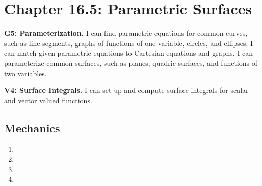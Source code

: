 \fancyhead[R]{\daytwentyfive}

\section*{\centering Chapter 16.5: Parametric Surfaces}

{\small \textbf{G5: Parameterization.} I can find parametric equations for common curves, such as line segments, graphs of functions of one variable, circles, and ellipses.  I can match given parametric equations to Cartesian equations and graphs. I can parameterize common surfaces, such as planes, quadric surfaces, and functions of two variables.

\textbf{V4: Surface Integrals.} I can set up and compute surface integrals for scalar and vector valued functions.}

\subsection*{Mechanics}
\begin{enumerate}
	\item {}
        {%
        
        }
    \item {}
        {%
        
        } 
	\item {}
        {%
        
        } 
    \item {}
        {%
        
        } 
\end{enumerate}
